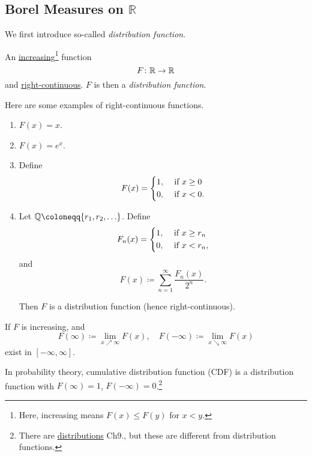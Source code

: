 \subsection{Borel Measures on \(\mathbb{R}\)}
We first introduce so-called \emph{distribution function}.

\begin{definition}
	An \underline{increasing}\footnote{Here, increasing means \(F(x)\leq F(y)\) for \(x<y\).} function
	\[
		F\colon \mathbb{\MakeUppercase{R}} \to \mathbb{\MakeUppercase{R}}
	\]
	and \underline{right-continuous}. \(F\) is then a \emph{distribution function}.
\end{definition}

\begin{eg}
	Here are some examples of right-continuous functions.
	\begin{enumerate}
		\item \(F(x) = x\).
		\item \(F(x) = e^x\).
		\item Define
		      \[
			      F(x) = \begin{dcases}
				      1, & \text{ if } x\geq 0 \\
				      0, & \text{ if } x < 0.
			      \end{dcases}
		      \]
		\item Let \(\mathbb{\MakeUppercase{Q}} \coloneqq \{r_1, r_2, \ldots  \}\). Define
		      \[
			      F_n(x) = \begin{dcases}
				      1, & \text{ if } x\geq r_n \\
				      0, & \text{ if } x < r_n,
			      \end{dcases}
		      \]
		      and
		      \[
			      F(x) \coloneqq \sum\limits_{n=1}^{\infty} \frac{F_n(x)}{2^n}.
		      \]

		      Then \(F\) is a distribution function (hence right-continuous).
	\end{enumerate}
\end{eg}
\begin{note}
	If \(F\) is increasing, and
	\[
		F(\infty )\coloneqq \lim\limits_{x \nearrow \infty} F(x),\quad F(-\infty ) \coloneqq \lim\limits_{x \searrow \infty} F(x)
	\]
	exist in \([-\infty , \infty ]\).

	In probability theory, cumulative distribution function (CDF) is a distribution function with \(F(\infty ) = 1\), \(F(-\infty ) = 0\).\footnote{There are \underline{distributions} \cite{folland1999real} Ch9., but these are different from distribution functions.}
\end{note}

